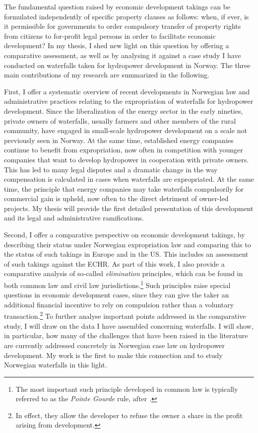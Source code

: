 \documentclass[12pt,a4paper]{article} %
\begin{document}
The fundamental question raised by economic development takings can be formulated independently of specific property clauses as follows: when, if ever, is it permissible for governments to order compulsory transfer of property rights from citizens to for-profit legal persons in order to facilitate economic development? In my thesis, I shed new light on this question by offering a comparative assessment, as well as by analysing it against a case study I have conducted on waterfalls taken for hydropower development in Norway. The three main contributions of my research are summarized in the following.

First, I offer a systematic overview of recent developments in Norwegian law and administrative practices relating to the expropriation of waterfalls for hydropower development. Since the liberalization of the energy sector in the early nineties, private owners of waterfalls, usually farmers and other members of the rural community, have engaged in small-scale hydropower development on a scale not previously seen in Norway. At the same time, established energy companies continue to benefit from expropriation, now often in competition with younger companies that want to develop hydropower in cooperation with private owners. This has led to many legal disputes and a dramatic change in the way compensation is calculated in cases when waterfalls are expropriated. At the same time, the principle that energy companies may take waterfalls compulsorily for commercial gain is upheld, now often to the direct detriment of owner-led projects. My thesis will provide the first detailed presentation of this development and its legal and administrative ramifications.

Second, I offer a comparative perspective on economic development takings, by describing their status under Norwegian expropriation law and comparing this to the status of such takings in Europe and in the US. This includes an assessment of such takings against the ECHR. As part of this work, I also provide a comparative analysis of so-called {\it elimination} principles, which can be found in both common law and civil law jurisdictions.\footnote{The most important such principle developed in common law is typically referred to as the {\it Pointe Gourde} rule, after \cite{gourde47}.} Such principles raise special questions in economic development cases, since they can give the taker an additional financial incentive to rely on compulsion rather than a voluntary transaction.\footnote{In effect, they allow the developer to refuse the owner a share in the profit arising from development.} To further analyse important points addressed in the comparative study, I will draw on the data I have assembled concerning waterfalls. I will show, in particular, how many of the challenges that have been raised in the literature are currently addressed concretely in Norwegian case law on hydropower development. My work is the first to make this connection and to study Norwegian waterfalls in this light.
\end{document}
